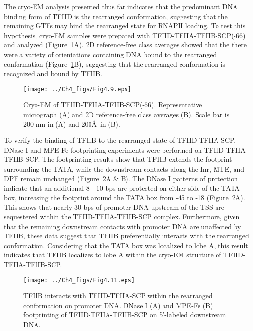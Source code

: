 The cryo-EM analysis presented thus far indicates that the predominant DNA binding form of TFIID is the rearranged conformation, suggesting that the remaining GTFs may bind the rearranged state for RNAPII loading. To test this hypothesis, cryo-EM samples were prepared with TFIID-TFIIA-TFIIB-SCP(-66) and analyzed (Figure~\ref{fig:Fig4.9}A). 2D reference-free class averages showed that the there were a variety of orientations containing DNA bound to the rearranged conformation (Figure~\ref{fig:Fig4.9}B), suggesting that the rearranged conformation is recognized and bound by TFIIB. \\
\begin{figure}
\centering
\texttt{[image: ../Ch4\_figs/Fig4.9.eps]}
\caption[Cryo-EM of TFIID-TFIIA-TFIIB-SCP(-66)]{Cryo-EM of TFIID-TFIIA-TFIIB-SCP(-66). Representative micrograph (A) and 2D reference-free class averages (B).  Scale bar is 200 nm in (A) and 200\AA\ in (B).}
\label{fig:Fig4.9}
\end{figure}
\indent To verify the binding of TFIIB to the rearranged state of TFIID-TFIIA-SCP, DNase I and MPE-Fe footprinting experiments were performed on TFIID-TFIIA-TFIIB-SCP. The footprinting results show that TFIIB extends the footprint surrounding the TATA, while the downstream contacts along the Inr, MTE, and DPE remain unchanged (Figure~\ref{fig:Fig4.11}A \& B). The DNase I patterns of protection indicate that an additional 8 - 10 bps are protected on either side of the TATA box, increasing the footprint around the TATA box from -45 to -18 (Figure~\ref{fig:Fig4.11}A). This shows that nearly 30 bps of promoter DNA upstream of the TSS are sequestered within the TFIID-TFIIA-TFIIB-SCP complex. Furthermore, given that the remaining downstream contacts with promoter DNA are unaffected by TFIIB, these data suggest that TFIIB preferentially interacts with the rearranged conformation. Considering that the TATA box was localized to lobe A, this result indicates that TFIIB localizes to lobe A within the cryo-EM structure of TFIID-TFIIA-TFIIB-SCP.\\
\begin{figure}
\centering
\texttt{[image: ../Ch4\_figs/Fig4.11.eps]}
\caption[TFIIB interacts with TFIID-TFIIA-SCP within the rearranged conformation on promoter DNA]{TFIIB interacts with TFIID-TFIIA-SCP within the rearranged conformation on promoter DNA. DNase I (A) and MPE-Fe (B) footprinting of TFIID-TFIIA-TFIIB-SCP on 5'-labeled downstream DNA. }
\label{fig:Fig4.11}
\end{figure}
